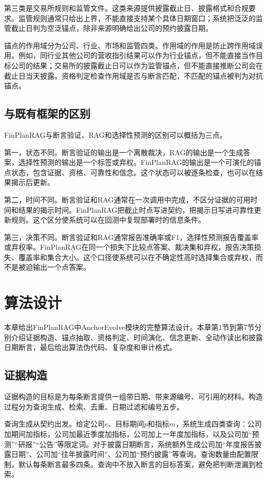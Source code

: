 第三类是交易所规则和监管文件。这类来源提供披露截止日、披露格式和合规要求。监管规则通常只给出上界，不能直接支持某个具体日期窗口；系统把泛泛的监管截止日判为空泛锚点，除非来源明确给出公司的预约披露日期。

锚点的作用域分为公司、行业、市场和监管四类。作用域的作用是防止跨作用域误用。例如，同行业其他公司的营收指引结果可以作为行业锚点，但不能直接当作目标公司的结果；交易所的披露截止日可以作为监管锚点，但不能直接推断公司会在截止日当天披露。资格判定检查作用域是否与断言匹配，不匹配的锚点被判为对抗锚点。

\section{与既有框架的区别}

FinPlanRAG与断言验证、RAG和选择性预测的区别可以概括为三点。

第一，状态不同。断言验证的输出是一个离散裁决，RAG的输出是一个生成答案，选择性预测的输出是一个标签或弃权。FinPlanRAG的输出是一个可演化的锚点状态，包含证据、资格、可靠性和信念。这个状态可以被逐条检查，也可以在结果揭示后更新。

第二，时间不同。断言验证和RAG通常在一次调用中完成，不区分证据的可用时间和结果的揭示时间。FinPlanRAG把截止时点写进契约，把揭示日写进可靠性更新规则。这个区分使系统可以在回测中复现部署时的信息条件。

第三，决策不同。断言验证和RAG通常报告准确率或F1，选择性预测报告覆盖率或弃权率。FinPlanRAG在同一个损失下比较点答案、裁决集和弃权，报告决策损失、覆盖率和集合大小。这个口径使系统可以在不确定性高时选择集合或弃权，而不是被迫输出一个点答案。

\chapter{算法设计}
\label{ch:algorithm}

本章给出FinPlanRAG中AnchorEvolve模块的完整算法设计。本章第1节到第7节分别介绍证据构造、锚点抽取、资格判定、时间演化、信念更新、全动作读出和披露日期断言，最后给出算法伪代码、复杂度和审计格式。

\section{证据构造}

证据构造的目标是为每条断言提供一组带日期、带来源编号、可引用的材料。构造过程分为查询生成、检索、去重、日期过滤和编号五步。

查询生成从契约出发。给定公司$e$、目标期间$p$和指标$m$，系统生成四类查询：公司加期间加指标，公司加最近季度加指标，公司加上一年度加指标，以及公司加“预测”“研报”“公告”等限定词。对于披露日期断言，系统额外生成公司加“年度报告披露日期”、公司加“往年披露时间”、公司加“预约披露”等查询。查询数量由配置限制，默认每条断言最多四条。查询中不放入断言的目标答案，避免把判断泄漏到检索。

